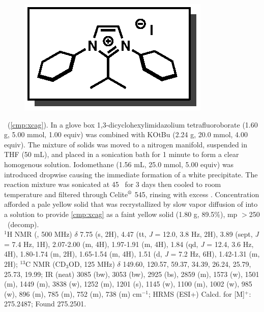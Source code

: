 \vspace{10pt}
\begin{figure}
  \vspace{-25pt}
  \begin{center}
    \includegraphics[scale=0.8]{chp_alkylation/images/xcag}
  \end{center}
  \vspace{-30pt}
\end{figure}
\noindent \textbf{\CMPxcag}\ (\ref{cmp:xcag}). In a glove box 1,3-dicyclohexylimidazolium
tetrafluoroborate (1.60 g, 5.00 mmol, 1.00 equiv) was combined with KOtBu (2.24 g, 20.0 mmol, 4.00
equiv). The mixture of solids was moved to a nitrogen manifold, suspended in THF (50 mL), and placed
in a sonication bath for 1 minute to form a clear homogenous solution.
Iodomethane (1.56 mL, 25.0 mmol, 5.00 equiv) was introduced dropwise causing the immediate
formation of a white precipitate. The reaction mixture was sonicated at 45 \degc\ for 3 days  then
cooled to room temperature and filtered through Celite$\textsuperscript{\textregistered}$ 545, rinsing with excess . Concentration
afforded a pale yellow solid that was recrystallized by slow vapor diffusion of  into a
 solution to provide \ref{cmp:xcag} as a faint yellow solid (1.80 g, 89.5\%), mp $>$250
\degc~(decomp).\\
$^1$H NMR (, 500 MHz) $\delta$ 7.75 (s, 2H), 4.47 (tt, \textit{J} = 12.0, 3.8 Hz, 2H),
3.89 (sept, \textit{J} = 7.4 Hz, 1H), 2.07-2.00 (m, 4H), 1.97-1.91 (m, 4H), 1.84 (qd, \textit{J}
= 12.4, 3.6 Hz, 4H), 1.80-1.74 (m, 2H), 1.65-1.54 (m, 4H), 1.51 (d, \textit{J} = 7.2 Hz,
6H), 1.42-1.31 (m, 2H); $^{13}$C NMR (CD$_3$OD, 125 MHz) $\delta$ 149.60, 120.57, 59.37, 34.39, 26.24, 25.79, 25.73, 19.99; IR (neat)  3085 (bw), 3053 (bw), 2925 (bs), 2859 (m), 1573 (w), 1501 (m), 1449 (m), 3838 (w), 1252 (m), 1201 (s), 1145 (w), 1100 (m), 1002 (w), 985 (w), 896 (m), 785 (m), 752 (m),
738 (m) cm$^{-1}$; HRMS (ESI+) Calcd.
for  [M]$^+$:
275.2487; Found 275.2501.

